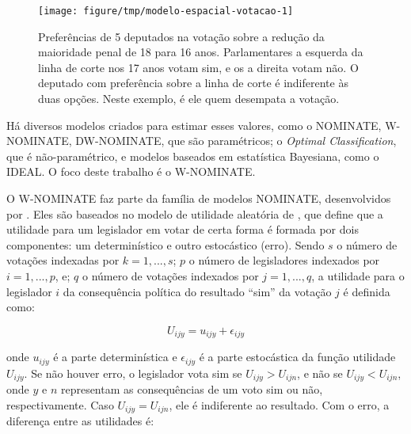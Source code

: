 \documentclass[a4paper,titlepage]{ppgi}\usepackage[]{graphicx}\usepackage[]{color}
\newenvironment{knitrout}{}{} %
\begin{document}
\begin{knitrout}
\color{fgcolor}\begin{figure}
\texttt{[image: figure/tmp/modelo-espacial-votacao-1]} \caption[Preferências de 5 deputados na votação sobre a redução da maioridade penal de 18 para 16 anos]{Preferências de 5 deputados na votação sobre a redução da maioridade penal de 18 para 16 anos.  Parlamentares a esquerda da linha de corte nos 17 anos votam sim, e os a direita votam não. O deputado com preferência sobre a linha de corte é indiferente às duas opções. Neste exemplo, é ele quem desempata a votação.}\label{fig:modelo-espacial-votacao}
\end{figure}


\end{knitrout}

Há diversos modelos criados para estimar esses valores, como o NOMINATE,
W-NOMINATE, DW-NOMINATE, que são paramétricos; o \emph{Optimal Classification},
que é não-paramétrico, e modelos baseados em estatística Bayesiana, como o
IDEAL. O foco deste trabalho é o W-NOMINATE.
\cite{Poole1985,Poole2000,Poole2005,Jackman2000,Clinton2004}

O W-NOMINATE faz parte da família de modelos NOMINATE, desenvolvidos por
. Eles são baseados no modelo de utilidade aleatória de
, que define que a utilidade para um legislador em
votar de certa forma é formada por dois componentes: um determinístico e outro
estocástico (erro). Sendo $s$ o número de votações indexadas por $k = 1, ...,
s$; $p$ o número de legisladores indexados por $i = 1, ..., p$, e; $q$ o número
de votações indexados por $j = 1, ..., q$, a utilidade para o legislador $i$ da
consequência política do resultado ``sim'' da votação $j$ é definida como:

\begin{equation}
\label{eq:random-utility}
 U_{ijy} = u_{ijy} + \epsilon_{ijy}
\end{equation}

onde $u_{ijy}$ é a parte determinística e $\epsilon_{ijy}$ é a parte
estocástica da função utilidade $U_{ijy}$. Se não houver erro, o legislador vota sim se
$U_{ijy} > U_{ijn}$, e não se $U_{ijy} < U_{ijn}$, onde $y$ e $n$ representam as
consequências de um voto sim ou não, respectivamente. Caso $U_{ijy} = U_{ijn}$,
ele é indiferente ao resultado. Com o erro, a diferença entre as utilidades é:
\end{document}

